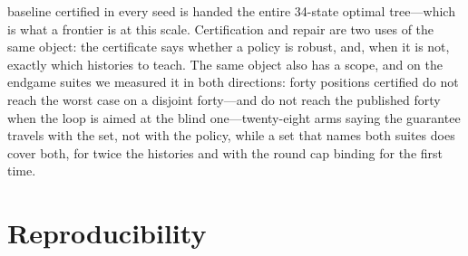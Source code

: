 \documentclass[conference]{IEEEtran}
\begin{document}
baseline certified in every seed is handed the entire 34-state optimal tree---which is what a frontier is at this scale. Certification and repair are two uses of the same object: the certificate says whether a policy is robust, and, when it is not, exactly which histories to teach. The same object also has a scope, and on the endgame suites we measured it in both directions: forty positions certified do not reach the worst case on a disjoint forty---and do not reach the published forty when the loop is aimed at the blind one---twenty-eight arms saying the guarantee travels with the set, not with the policy, while a set that names both suites does cover both, for twice the histories and with the round cap binding for the first time.

\section*{Reproducibility}
\end{document}
